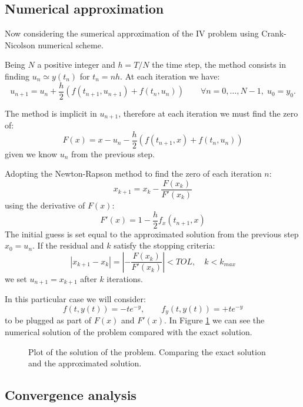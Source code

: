 \documentclass[]{article}
\begin{document}
\newpage

\subsection{Numerical approximation}
Now considering the sumerical approximation of the IV problem using Crank-Nicolson numerical scheme. 

Being $N$ a positive integer and $h = T /N$ the time step, the method consists in finding $u_n \simeq y(t_n )$ for $t_n = nh$.
At each iteration we have:
$$u_{n+1} = u_n + \frac{h}{2} \left( f(t_{n+1},u_{n+1}) + f(t_{n},u_{n})  \right) \qquad \forall n = 0, \ldots , N - 1, \; u_0 = y_0 . $$

The method is implicit in $u_{n+1}$, therefore at each iteration we must find the zero of:
\begin{equation}\label{eq::nonlin}
	F(x) = x - u_n - \frac{h}{2} \left( f(t_{n+1}, x) + f(t_{n},u_{n})  \right) 
\end{equation}
given we know $u_n$ from the previous step.

Adopting the Newton-Rapson method to find the zero of each iteration $n$:
$$x_{k+1} = x_{k} - \frac{F(x_k)}{F'(x_k)}$$
using the derivative of $F(x)$: 
\begin{equation}\label{eq::nonlinder}
	F'(x) = 1 - \frac{h}{2}  f_x(t_{n+1}, x)
\end{equation}
The initial guess is set equal to the approximated solution from the previous step $x_0 = u_n$. If the residual  and $k$ satisfy the stopping criteria:
$$|x_{k+1} - x_{k} | =\left|-  \frac{F(x_k)}{F'(x_k)} \right|  < TOL, \quad k<k_{max}$$
we set $u_{n+1} = x_{k+1}$ after $k$ iterations.

In this particular case we will consider:
$$f(t, y(t)) = -t e^{-y}, \qquad f_y (t, y(t)) = +t e^{-y} $$
to be plugged as part of $F(x)$ and $F'(x)$. In Figure \ref{fig::solution} we can see the numerical solution of the problem compared with the exact solution.

\begin{figure}[h!]
	\centering
	\caption{Plot of the solution of the problem. Comparing the exact solution and the approximated solution.}
	\label{fig::solution}
\end{figure}

\newpage

\subsection{Convergence analysis}
\end{document}
